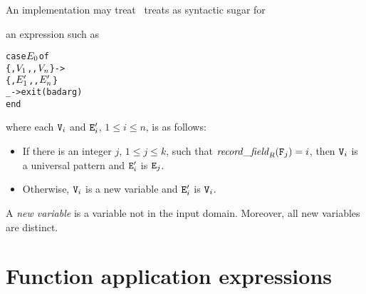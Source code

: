 \ifStd An implementation may treat \fi
\ifOld \OldErlang\ treats \fi
{}
as syntactic sugar for
\iftrue
an expression such as
\begin{alltt}
case \(\Z{E}\sb{0}\) of
    \{,\(\Z{V}\sb{1}\),\tdots,\(\Z{V}\sb{n}\)\} ->
        \{,\(\Z{E}\sp{\prime}\sb{1}\),\tdots,\(\Z{E}\sp{\prime}\sb{n}\)\}
    _ -> exit(badarg)
end
\end{alltt}
where each $\TZ{V}_i$ and $\TZ{E}'_i$, $1\leq i\leq n$, is as follows:
\begin{itemize}
\item If there is an integer
$j$, $1\leq j\leq k$, such that $\mathit{record\_field}_{\TZm{R}}(\TZ{F}_j)=i$,
then $\TZ{V}_i$ is a universal pattern and $\TZ{E}'_i$ is ${\tt{\sl E}}_j$.
\item Otherwise, $\TZ{V}_i$ is a new variable and $\TZ{E}'_i$ is $\TZ{V}_i$.
\end{itemize}
\else
a function application
\begin{alltt}
fun (\(\Z{V}\sb{0}\),\(\Z{V}\sb{1}\),\tdots,\(\Z{V}\sb{k}\)) ->
    case \(\Z{V}\sb{0}\) of
        \{\Z{R},\(\Z{W}\sb{1}\),\tdots,\(\Z{W}\sb{n}\)\} ->
            \{\Z{R},\(\Z{E}\sp{\prime}\sb{1}\),\tdots,\(\Z{E}\sp{\prime}\sb{n}\)\}
        _ -> exit(badarg)
    end (\(\Z{E}\sb{0}\),\(\Z{E}\sb{1}\),\tdots,\(\Z{E}\sb{k}\))
\end{alltt}
where each $\TZ{V}_i$, $0\leq i\leq k$, is a new variable
and each $\TZ{W}_i$ and $\TZ{E}'_i$, $1\leq i\leq n$, is as follows:
\begin{itemize}
\item If there is an integer
$j$, $1\leq j\leq k$, such that $\mathit{record\_field}_{\TZm{R}}(\TZ{F}_j)=i$,
then $\TZ{W}_i$ is a universal pattern and $\TZ{E}'_i$ is $\TZ{V}_j$.
\item Otherwise, $\TZ{W}_i$ is a new variable and $\TZ{E}'_i$ is $\TZ{W}_i$.
\end{itemize}
\fi
A \emph{new variable} is a variable not in the input domain.
Moreover, all new variables are distinct.

\section{Function application expressions}

\label{section:application-exprs}

